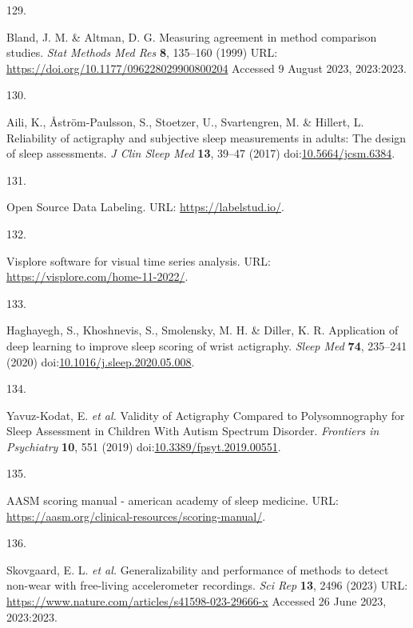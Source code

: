 \documentclass[
  10pt,
]{scrbook}
\newlength{\cslhangindent}
\newlength{\csllabelwidth}
\newlength{\cslentryspacingunit} %
\newenvironment{CSLReferences}[2] %
 {%
  \setlength{\parindent}{0pt}
  \ifodd #1
  \let\oldpar\par
  \def\par{\hangindent=\cslhangindent\oldpar}
  \fi
  \setlength{\parskip}{#2\cslentryspacingunit}
 }%
 {}
\newcommand{\CSLLeftMargin}[1]{\parbox[t]{\csllabelwidth}{#1}}
\newcommand{\CSLRightInline}[1]{\parbox[t]{\linewidth - \csllabelwidth}{#1}\break}
\begin{document}
\begin{CSLReferences}{0}{0}
\leavevmode{}%
\CSLLeftMargin{129. }%
\CSLRightInline{Bland, J. M. \& Altman, D. G. Measuring agreement in
method comparison studies. \emph{Stat Methods Med Res} \textbf{8},
135--160 (1999) URL: \url{https://doi.org/10.1177/096228029900800204}
Accessed 9 August 2023, 2023:2023.}

\leavevmode{}%
\CSLLeftMargin{130. }%
\CSLRightInline{Aili, K., Åström-Paulsson, S., Stoetzer, U.,
Svartengren, M. \& Hillert, L. Reliability of actigraphy and subjective
sleep measurements in adults: The design of sleep assessments. \emph{J
Clin Sleep Med} \textbf{13}, 39--47 (2017)
doi:\href{https://doi.org/10.5664/jcsm.6384}{10.5664/jcsm.6384}.}

\leavevmode{}%
\CSLLeftMargin{131. }%
\CSLRightInline{Open Source Data Labeling. URL:
\url{https://labelstud.io/}.}

\leavevmode{}%
\CSLLeftMargin{132. }%
\CSLRightInline{Visplore {\textendash} software for visual time series
analysis. URL: \url{https://visplore.com/home-11-2022/}.}

\leavevmode{}%
\CSLLeftMargin{133. }%
\CSLRightInline{Haghayegh, S., Khoshnevis, S., Smolensky, M. H. \&
Diller, K. R. Application of deep learning to improve sleep scoring of
wrist actigraphy. \emph{Sleep Med} \textbf{74}, 235--241 (2020)
doi:\href{https://doi.org/10.1016/j.sleep.2020.05.008}{10.1016/j.sleep.2020.05.008}.}

\leavevmode{}%
\CSLLeftMargin{134. }%
\CSLRightInline{Yavuz-Kodat, E. \emph{et al.} Validity of Actigraphy
Compared to Polysomnography for Sleep Assessment in Children With Autism
Spectrum Disorder. \emph{Frontiers in Psychiatry} \textbf{10}, 551
(2019)
doi:\href{https://doi.org/10.3389/fpsyt.2019.00551}{10.3389/fpsyt.2019.00551}.}

\leavevmode{}%
\CSLLeftMargin{135. }%
\CSLRightInline{AASM scoring manual - american academy of sleep
medicine. URL:
\url{https://aasm.org/clinical-resources/scoring-manual/}.}

\leavevmode{}%
\CSLLeftMargin{136. }%
\CSLRightInline{Skovgaard, E. L. \emph{et al.} Generalizability and
performance of methods to detect non-wear with free-living accelerometer
recordings. \emph{Sci Rep} \textbf{13}, 2496 (2023) URL:
\url{https://www.nature.com/articles/s41598-023-29666-x} Accessed 26
June 2023, 2023:2023.}


\end{CSLReferences}
\end{document}
